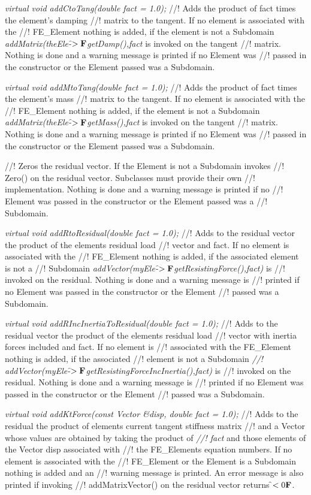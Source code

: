{{\em virtual void addCtoTang(double fact = 1.0); }
//! Adds the product of \p fact times the element's damping
//! matrix to the tangent. If no element is associated with the
//! FE\_Element nothing is added, if the element is not a Subdomain 
{\em addMatrix(theEle-\f$>{\bf F}$getDamp(),fact} is invoked on the tangent
//! matrix. Nothing is done and a warning message is printed if no Element was
//! passed in the constructor or the Element passed was a Subdomain.  


{\em virtual void addMtoTang(double fact = 1.0); }
//! Adds the product of \p fact times the element's mass
//! matrix to the tangent. If no element is associated with the
//! FE\_Element nothing is added, if the element is not a Subdomain 
{\em addMatrix(theEle-\f$>{\bf F}$getMass(),fact} is invoked on the tangent
//! matrix. Nothing is done and a warning message is printed if no Element was
//! passed in the constructor or the Element passed was a Subdomain.  

//! Zeros the residual vector. If the Element is not a Subdomain invokes
//! Zero() on the residual vector. Subclasses must provide their own
//! implementation. Nothing is done and a warning message is printed if no
//! Element was passed in the constructor or the Element passed was a
//! Subdomain. 


{\em virtual void addRtoResidual(double fact = 1.0); }
//! Adds to the residual vector the product of the elements residual load
//! vector and \p fact. If no element is associated with the
//! FE\_Element nothing is added, if the associated element is not a
//! Subdomain {\em addVector(myEle-\f$>{\bf F}$getResistingForce(),fact)} is
//! invoked on the residual. Nothing is done and a warning message is
//! printed if no Element was passed in the constructor or the Element
//! passed was a Subdomain.   

{\em virtual void addRIncInertiaToResidual(double fact = 1.0); }
//! Adds to the residual vector the product of the elements residual load
//! vector with inertia forces included and \p fact. If no element is
//! associated with the FE\_Element nothing is added, if the associated
//! element is not a Subdomain {\em
//! addVector(myEle-\f$>{\bf F}$getResistingForceIncInertia(),fact)} is 
//! invoked on the residual. Nothing is done and a warning message is
//! printed if no Element was passed in the constructor or the Element
//! passed was a Subdomain.   

{\em virtual void addKtForce(const Vector \&disp, double fact = 1.0);    }
//! Adds to the residual the product of elements current tangent stiffness matrix
//! and a Vector whose values are obtained by taking the product of {\em
//! fact} and those elements of the Vector \p disp associated with 
//! the FE\_Elements equation numbers. If no element is associated with the
//! FE\_Element or the Element is a Subdomain nothing is added and an
//! warning message is printed. An error message is also printed if invoking
//! addMatrixVector() on the residual vector returns \f$< 0{\bf F}$.

}
